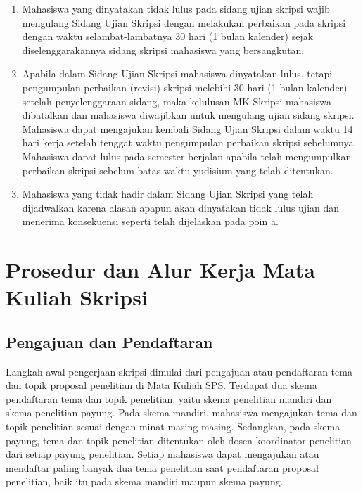 \documentclass[
  indonesian,
  letterpaper,
]{scrbook}
\providecommand{\tightlist}{%
  \setlength{\itemsep}{0pt}\setlength{\parskip}{0pt}}
\begin{document}
\begin{enumerate}
\def\labelenumi{\alph{enumi}.}
\tightlist
\item
  Mahasiswa yang dinyatakan tidak lulus pada sidang ujian skripsi wajib
  mengulang Sidang Ujian Skripsi dengan melakukan perbaikan pada skripsi
  dengan waktu selambat-lambatnya 30 hari (1 bulan kalender) sejak
  diselenggarakannya sidang skripsi mahasiswa yang bersangkutan.
\item
  Apabila dalam Sidang Ujian Skripsi mahasiswa dinyatakan lulus, tetapi
  pengumpulan perbaikan (revisi) skripsi melebihi 30 hari (1 bulan
  kalender) setelah penyelenggaraan sidang, maka kelulusan MK Skripsi
  mahasiswa dibatalkan dan mahasiswa diwajibkan untuk mengulang ujian
  sidang skripsi. Mahasiswa dapat mengajukan kembali Sidang Ujian
  Skripsi dalam waktu 14 hari kerja setelah tenggat waktu pengumpulan
  perbaikan skripsi sebelumnya. Mahasiswa dapat lulus pada semester
  berjalan apabila telah mengumpulkan perbaikan skripsi sebelum batas
  waktu yudisium yang telah ditentukan.
\item
  Mahasiswa yang tidak hadir dalam Sidang Ujian Skripsi yang telah
  dijadwalkan karena alasan apapun akan dinyatakan tidak lulus ujian dan
  menerima konsekuensi seperti telah dijelaskan pada poin a.
\end{enumerate}

\section{Prosedur dan Alur Kerja Mata Kuliah
Skripsi}\label{prosedur-dan-alur-kerja-mata-kuliah-skripsi}

\subsection*{Pengajuan dan Pendaftaran}\label{pengajuan-dan-pendaftaran}

Langkah awal pengerjaan skripsi dimulai dari pengajuan atau pendaftaran
tema dan topik proposal penelitian di Mata Kuliah SPS. Terdapat dua
skema pendaftaran tema dan topik penelitian, yaitu skema penelitian
mandiri dan skema penelitian payung. Pada skema mandiri, mahasiswa
mengajukan tema dan topik penelitian sesuai dengan minat masing-masing.
Sedangkan, pada skema payung, tema dan topik penelitian ditentukan oleh
dosen koordinator penelitian dari setiap payung penelitian. Setiap
mahasiswa dapat mengajukan atau mendaftar paling banyak dua tema
penelitian saat pendaftaran proposal penelitian, baik itu pada skema
mandiri maupun skema payung.
\end{document}
